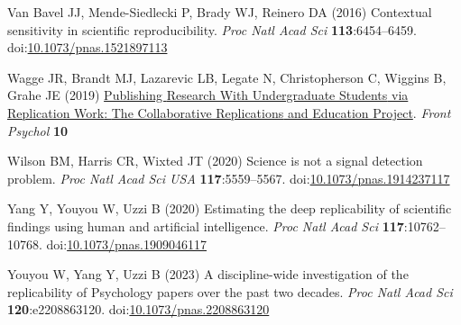\documentclass[
  english,
  a4paper,
]{article}
\newlength{\cslhangindent}
\newlength{\cslentryspacingunit} %
\newenvironment{CSLReferences}[2] %
 {%
  \setlength{\parindent}{0pt}
  \ifodd #1
  \let\oldpar\par
  \def\par{\hangindent=\cslhangindent\oldpar}
  \fi
  \setlength{\parskip}{#2\cslentryspacingunit}
 }%
 {}
\begin{document}
\begin{CSLReferences}{1}{0}
\leavevmode{}%
Van Bavel JJ, Mende-Siedlecki P, Brady WJ, Reinero DA (2016) Contextual sensitivity in scientific reproducibility. \emph{Proc Natl Acad Sci} \textbf{113}:6454--6459. doi:\href{https://doi.org/10.1073/pnas.1521897113}{10.1073/pnas.1521897113}

\leavevmode{}%
Wagge JR, Brandt MJ, Lazarevic LB, Legate N, Christopherson C, Wiggins B, Grahe JE (2019) \href{https://www.frontiersin.org/articles/10.3389/fpsyg.2019.00247}{Publishing {Research With Undergraduate Students} via {Replication Work}: {The Collaborative Replications} and {Education Project}}. \emph{Front Psychol} \textbf{10}

\leavevmode{}%
Wilson BM, Harris CR, Wixted JT (2020) Science is not a signal detection problem. \emph{Proc Natl Acad Sci USA} \textbf{117}:5559--5567. doi:\href{https://doi.org/10.1073/pnas.1914237117}{10.1073/pnas.1914237117}

\leavevmode{}%
Yang Y, Youyou W, Uzzi B (2020) Estimating the deep replicability of scientific findings using human and artificial intelligence. \emph{Proc Natl Acad Sci} \textbf{117}:10762--10768. doi:\href{https://doi.org/10.1073/pnas.1909046117}{10.1073/pnas.1909046117}

\leavevmode{}%
Youyou W, Yang Y, Uzzi B (2023) A discipline-wide investigation of the replicability of {Psychology} papers over the past two decades. \emph{Proc Natl Acad Sci} \textbf{120}:e2208863120. doi:\href{https://doi.org/10.1073/pnas.2208863120}{10.1073/pnas.2208863120}

\end{CSLReferences}
\end{document}
